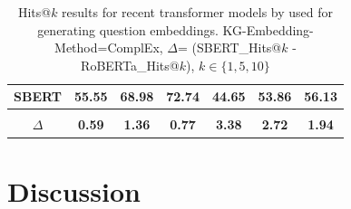 \begin{table}[]
\begin{tabular}{lrrrrrr}
\multicolumn{1}{l|}{SBERT \cite{reimers-2019-sentence-bert}}                & \multicolumn{1}{r|}{\textbf{55.55}} & \multicolumn{1}{r|}{\textbf{68.98}} & \multicolumn{1}{r|}{\textbf{72.74}} & \multicolumn{1}{r|}{\textbf{44.65}} & \multicolumn{1}{r|}{\textbf{53.86}} & \textbf{56.13}                    \\ \hline
                                                        & \multicolumn{1}{l}{}                & \multicolumn{1}{l}{}                & \multicolumn{1}{l}{}                & \multicolumn{1}{l}{}                & \multicolumn{1}{l}{}                & \multicolumn{1}{l}{}              \\ \hline
\multicolumn{1}{c|}{$\Delta$}                              & \multicolumn{1}{c|}{\textbf{0.59}}  & \multicolumn{1}{c|}{\textbf{1.36}}  & \multicolumn{1}{c|}{\textbf{0.77}}  & \multicolumn{1}{c|}{\textbf{3.38}}  & \multicolumn{1}{c|}{\textbf{2.72}}  & \multicolumn{1}{c}{\textbf{1.94}} \\ \hline
\end{tabular}
\caption{Hits@$k$ results for recent transformer models by \cite{huggingface-transformers-package-2020} used for generating question embeddings.
KG-Embedding-Method=ComplEx, $\Delta$= (SBERT\_Hits@$k$ - RoBERTa\_Hits@$k$), $k\in\{1,5,10\}$}
\label{webqsp-ablation}
\end{table}

\section{Discussion}\label{sec: discussion}

